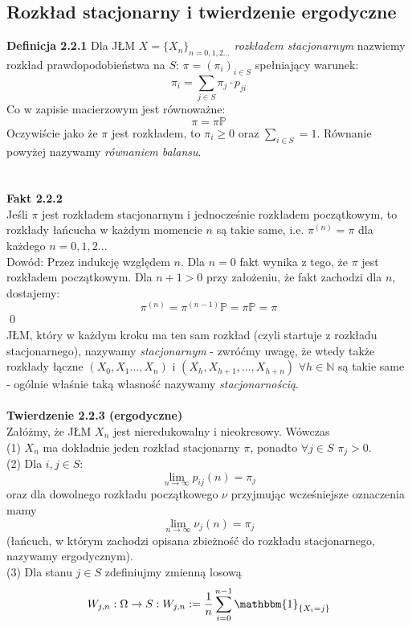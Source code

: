 \documentclass[a4paper]{article}
\begin{document}
\subsection{Rozkład stacjonarny i twierdzenie ergodyczne}
\textbf{Definicja 2.2.1}
Dla JŁM $X = \{X_n\}_{n = 0,1,2...}$ \textit{rozkładem stacjonarnym} nazwiemy rozkład prawdopodobieństwa na $S$: $\pi = (\pi_i)_{i \in S}$ spełniający warunek: \\
$$\pi_i = \sum\limits_{j \in S} \pi_j \cdot p_{ji}$$
Co w zapisie macierzowym jest równoważne:
$$\pi = \pi \mathbb{P}$$
Oczywiście jako że $\pi$ jest rozkładem, to $\pi_i \geq 0$ oraz $\sum\limits_{i \in S} = 1$. Równanie powyżej nazywamy \textit{równaniem balansu}.\\
\\\\
\textbf{Fakt 2.2.2}\\
Jeśli $\pi$ jest rozkładem stacjonarnym i jednocześnie rozkładem początkowym, to rozkłady łańcucha w każdym momencie $n$ są takie same, i.e. $\pi^{(n)} = \pi$ dla każdego $n = 0,1,2..$.
\\
Dowód: Przez indukcję względem $n$. Dla $n = 0$ fakt wynika z tego, że $\pi$ jest rozkładem początkowym. Dla $n+1>0$ przy założeniu, że fakt zachodzi dla $n$, dostajemy:
$$\pi^{(n)} = \pi^{(n-1)} \mathbb{P} = \pi \mathbb{P} = \pi$$ \qed\\
JŁM, który w każdym kroku ma ten sam rozkład (czyli startuje z rozkładu stacjonarnego), nazywamy \textit{stacjonarnym} - zwróćmy uwagę, że wtedy także rozkłady łączne $(X_0, X_1 ..., X_n)$ i $(X_h, X_{h+1}, ..., X_{h+n})$ $\forall h \in \mathbb{N}$ są takie same - ogólnie właśnie taką własność nazywamy \textit{stacjonarnością}.
\\\\
\textbf{Twierdzenie 2.2.3 (ergodyczne)}
\\ Załóżmy, że JŁM $X_n$ jest nieredukowalny i nieokresowy. Wówczas
\\ (1) $X_n$ ma dokładnie jeden rozkład stacjonarny $\pi$, ponadto $\forall j \in S$ $\pi_j > 0$.
\\ (2) Dla $i,j \in S$: $$\lim\limits_{n \to \infty} p_{ij}(n) = \pi_j$$ oraz dla dowolnego rozkładu początkowego $\nu$ przyjmując wcześniejsze oznaczenia mamy $$\lim\limits_{n \to \infty} \nu_j(n) = \pi_j$$ (łańcuch, w którym zachodzi opisana zbieżność do rozkładu stacjonarnego, nazywamy ergodycznym).
\\
(3) Dla stanu $j \in S$ zdefiniujmy zmienną losową $$W_{j,n}: \Omega \rightarrow S: W_{j,n} :=  \frac{1}{n} \sum\limits_{i = 0}^{n-1} \mathbbm{1}_{\{X_i = j\}}$$ 
\end{document}
